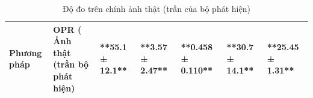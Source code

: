 \begin{table}
\caption{Độ đo trên chính ảnh thật (trần của bộ phát hiện)}
\begin{tabular}{llllll}
\toprule
Phương pháp & OPR (%
\midrule
Ảnh thật (trần bộ phát hiện) & **55.1 ± 12.1** & **3.57 ± 2.47** & **0.458 ± 0.110** & **30.7 ± 14.1** & **25.45 ± 1.31** \\
\bottomrule
\end{tabular}
\end{table}

